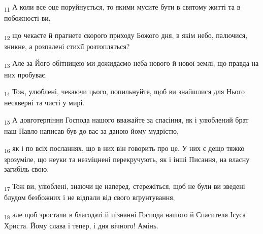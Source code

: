 \begin{tcolorbox}
\textsubscript{11} А коли все оце поруйнується, то якими мусите бути в святому житті та в побожності ви,
\end{tcolorbox}
\begin{tcolorbox}
\textsubscript{12} що чекаєте й прагнете скорого приходу Божого дня, в якім небо, палючися, зникне, а розпалені стихії розтопляться?
\end{tcolorbox}
\begin{tcolorbox}
\textsubscript{13} Але за Його обітницею ми дожидаємо неба нового й нової землі, що правда на них пробуває.
\end{tcolorbox}
\begin{tcolorbox}
\textsubscript{14} Тож, улюблені, чекаючи цього, попильнуйте, щоб ви знайшлися для Нього нескверні та чисті у мирі.
\end{tcolorbox}
\begin{tcolorbox}
\textsubscript{15} А довготерпіння Господа нашого вважайте за спасіння, як і улюблений брат наш Павло написав був до вас за даною йому мудрістю,
\end{tcolorbox}
\begin{tcolorbox}
\textsubscript{16} як і по всіх посланнях, що в них він говорить про це. У них є дещо тяжко зрозуміле, що неуки та незміцнені перекручують, як і інші Писання, на власну загибіль свою.
\end{tcolorbox}
\begin{tcolorbox}
\textsubscript{17} Тож ви, улюблені, знаючи це наперед, стережіться, щоб не були ви зведені блудом безбожних і не відпали від свого вґрунтування,
\end{tcolorbox}
\begin{tcolorbox}
\textsubscript{18} але щоб зростали в благодаті й пізнанні Господа нашого й Спасителя Ісуса Христа. Йому слава і тепер, і дня вічного! Амінь.
\end{tcolorbox}
